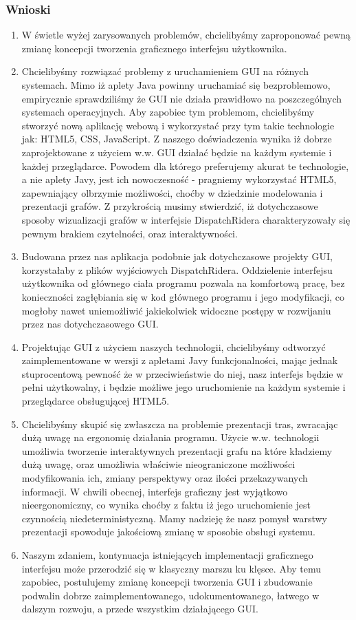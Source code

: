 \subsubsection{Wnioski}
\begin{enumerate}
\item W świetle wyżej zarysowanych problemów, chcielibyśmy zaproponować pewną zmianę koncepcji tworzenia graficznego interfejsu użytkownika.
\item Chcielibyśmy rozwiązać problemy z uruchamieniem GUI na różnych systemach. Mimo iż aplety Java powinny uruchamiać się bezproblemowo, empirycznie sprawdziliśmy że GUI nie działa prawidłowo na poszczególnych systemach operacyjnych. Aby zapobiec tym problemom, chcielibyśmy stworzyć nową aplikację webową i wykorzystać przy tym takie technologie jak: HTML5, CSS, JavaScript. Z naszego doświadczenia wynika iż dobrze zaprojektowane z użyciem w.w. GUI działać będzie na każdym systemie i każdej przeglądarce. Powodem dla którego preferujemy akurat te technologie, a nie aplety Javy, jest ich nowoczesność - pragniemy wykorzystać HTML5, zapewniający olbrzymie możliwości, choćby w dziedzinie modelowania i prezentacji grafów. Z przykrością musimy stwierdzić, iż dotychczasowe sposoby wizualizacji grafów w interfejsie DispatchRidera charakteryzowały się pewnym brakiem czytelności, oraz interaktywności.
\item Budowana przez nas aplikacja podobnie jak dotychczasowe projekty GUI, korzystałaby z plików wyjściowych DispatchRidera. Oddzielenie interfejsu użytkownika od głównego ciała programu pozwala na komfortową pracę, bez konieczności zagłębiania się w kod głównego programu i jego modyfikacji, co mogłoby nawet uniemożliwić jakiekolwiek widoczne postępy w rozwijaniu przez nas dotychczasowego GUI.
\item Projektując GUI z użyciem naszych technologii, chcielibyśmy odtworzyć zaimplementowane w wersji z apletami Javy funkcjonalności, mając jednak stuprocentową pewność że w przeciwieństwie do niej, nasz interfejs będzie w pełni użytkowalny, i będzie możliwe jego uruchomienie na każdym systemie i przeglądarce obsługującej HTML5.
\item Chcielibyśmy skupić się zwłaszcza na problemie prezentacji tras, zwracając dużą uwagę na ergonomię działania programu. Użycie w.w. technologii umożliwia tworzenie interaktywnych prezentacji grafu na które kładziemy dużą uwagę, oraz umożliwia właściwie nieograniczone możliwości modyfikowania ich, zmiany perspektywy oraz ilości przekazywanych informacji. W chwili obecnej, interfejs graficzny jest wyjątkowo nieergonomiczny, co wynika choćby z faktu iż jego uruchomienie jest czynnością niedeterministyczną. Mamy nadzieję że nasz pomysł warstwy prezentacji spowoduje jakościową zmianę w sposobie obsługi systemu.
\item Naszym zdaniem, kontynuacja istniejących implementacji graficznego interfejsu może przerodzić się w klasyczny marszu ku klęsce. Aby temu zapobiec, postulujemy zmianę koncepcji tworzenia GUI i zbudowanie podwalin dobrze zaimplementowanego, udokumentowanego, łatwego w dalszym rozwoju, a przede wszystkim działającego GUI.
\end{enumerate}
\vfill \hfill \newpage
